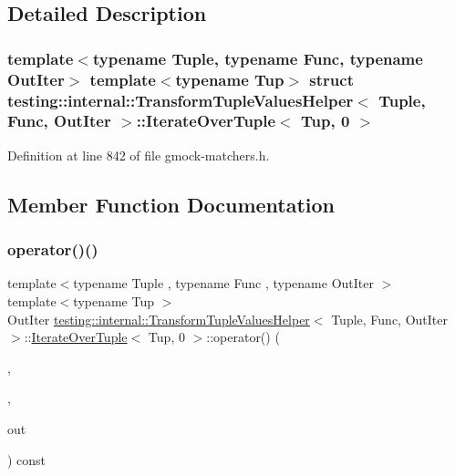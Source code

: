 \subsection{Detailed Description}
\subsubsection*{template$<$typename Tuple, typename Func, typename Out\+Iter$>$\newline
template$<$typename Tup$>$\newline
struct testing\+::internal\+::\+Transform\+Tuple\+Values\+Helper$<$ Tuple, Func, Out\+Iter $>$\+::\+Iterate\+Over\+Tuple$<$ Tup, 0 $>$}



Definition at line 842 of file gmock-\/matchers.\+h.



\subsection{Member Function Documentation}
\mbox{\label{structtesting_1_1internal_1_1TransformTupleValuesHelper_1_1IterateOverTuple_3_01Tup_00_010_01_4_ae045ff24334765553981b7dc25771128}} 
\subsubsection{\texorpdfstring{operator()()}{operator()()}}
{\footnotesize\ttfamily template$<$typename Tuple , typename Func , typename Out\+Iter $>$ \\
template$<$typename Tup $>$ \\
Out\+Iter \hyperlink{classtesting_1_1internal_1_1TransformTupleValuesHelper}{testing\+::internal\+::\+Transform\+Tuple\+Values\+Helper}$<$ Tuple, Func, Out\+Iter $>$\+::\hyperlink{structtesting_1_1internal_1_1TransformTupleValuesHelper_1_1IterateOverTuple}{Iterate\+Over\+Tuple}$<$ Tup, 0 $>$\+::operator() (\begin{DoxyParamCaption}\item[{Func}]{,  }\item[{const Tup \&}]{,  }\item[{Out\+Iter}]{out }\end{DoxyParamCaption}) const\hspace{0.3cm}{\ttfamily [inline]}}




